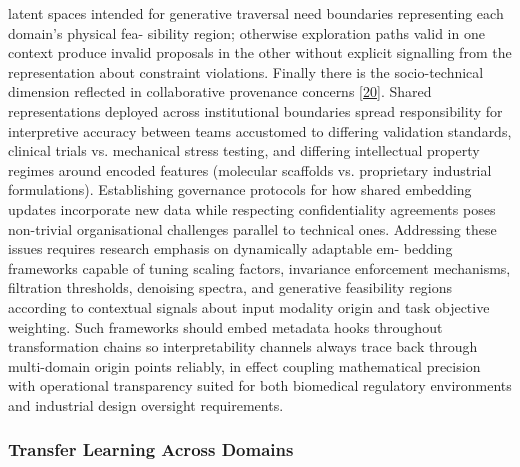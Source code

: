 \documentclass[
]{article}
\begin{document}
latent spaces intended for generative traversal need boundaries
representing each domain's physical fea- sibility region; otherwise
exploration paths valid in one context produce invalid proposals in the
other without explicit signalling from the representation about
constraint violations. Finally there is the socio-technical dimension
reflected in collaborative provenance concerns
{[}\hyperref[_bookmark60]{20}{]}. Shared representations deployed across
institutional boundaries spread responsibility for interpretive accuracy
between teams accustomed to differing validation standards, clinical
trials vs. mechanical stress testing, and differing intellectual
property regimes around encoded features (molecular scaffolds vs.
proprietary industrial formulations). Establishing governance protocols
for how shared embedding updates incorporate new data while respecting
confidentiality agreements poses non-trivial organisational challenges
parallel to technical ones. Addressing these issues requires research
emphasis on dynamically adaptable em- bedding frameworks capable of
tuning scaling factors, invariance enforcement mechanisms, filtration
thresholds, denoising spectra, and generative feasibility regions
according to contextual signals about input modality origin and task
objective weighting. Such frameworks should embed metadata hooks
throughout transformation chains so interpretability channels always
trace back through multi-domain origin points reliably, in effect
coupling mathematical precision with operational transparency suited for
both biomedical regulatory environments and industrial design oversight
requirements.

\subsubsection{Transfer Learning Across
Domains}\label{transfer-learning-across-domains}
\end{document}
